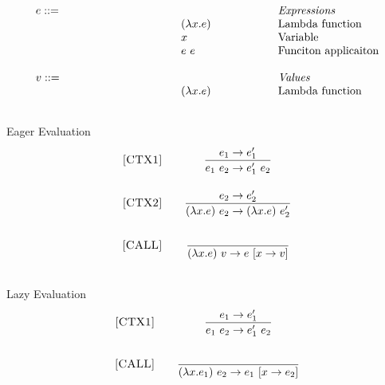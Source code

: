 \documentclass[addpoints]{exam}
\begin{document}
\newcommand{\mydefhead}[2]{\multicolumn{2}{l}{{#1}}&\mbox{\emph{#2}}\\}
\newcommand{\mydefcase}[2]{\qquad\qquad\qquad\qquad\qquad\qquad& #1 &\mbox{#2}\\}

\newcommand{\setexp}[2]{\mbox{\tt set}~#1~#2}
\newcommand{\readexp}[1]{\mbox{\tt read}~#1}
\newcommand{\loopexp}[2]{\mbox{\tt loop}~#1~#2}
\newcommand{\incexp}[1]{\mbox{\tt inc}~{#1}}
\newcommand{\testexp}[2]{\mbox{\tt test}~{#1}~{#2}}
\newcommand{\thenexp}[2]{#1~\mbox{\tt then}~{#2}}
\newcommand{\crashexp}{\mbox{\tt crash}}
\newcommand{\rel}[1]{ \mbox{\sc [#1]} }
\newcommand{\sstep}[2]{{#1} \rightarrow {#2}}
\newcommand{\bstep}[2]{{#1} \Downarrow {#2}}
\newcommand{\tstep}[2]{{#1} \colon {#2}}

\newcommand{\ssrule}[3]{
  \rel{#1} &
  \frac{\strut\begin{array}{@{}c@{}} #2 \end{array}}
       {\strut\begin{array}{@{}c@{}} #3 \end{array}}
   \\~\\
}

\newcommand{\Esucc}[1]{\mbox{\tt succ}~#1}
\newcommand{\Epred}[1]{\mbox{\tt pred}~#1}
\newcommand{\Eiszero}[1]{\mbox{\tt iszero}~#1}
\newcommand{\Econcat}[2]{\mbox{\tt concat}~{#1}~{#2}}
\newcommand{\Eisstring}[1]{\mbox{\tt isstring}~#1}
\newcommand{\Eisint}[1]{\mbox{\tt isint}~#1}
\newcommand{\Eisbool}[1]{\mbox{\tt isbool}~#1}
\newcommand{\ife}[3]{\mbox{\tt if}~{#1}~\mbox{\tt then}~{#2}~\mbox{\tt else}~{#3}}
\newcommand{\true}{\mbox{\tt true}}
\newcommand{\false}{\mbox{\tt false}}
\newcommand{\lamexp}[2]{(\lambda{#1}.{#2})}

\[
  \begin{array}{ll@{\qquad\qquad\qquad}l}
  \mydefhead{e ::=}{Expressions}
    \mydefcase{\lamexp{x}{e}}{Lambda function}
    \mydefcase{x}{Variable}
    \mydefcase{e~e}{Funciton applicaiton}
  \\
  \mydefhead{v ::=}{Values}
    \mydefcase{\lamexp{x}{e}}{Lambda function}
  \\
\end{array}
\]


Eager Evaluation
\[
  \begin{array}{r@{\qquad}c}
    \ssrule{CTX1}{
        \sstep{e_1}{e_1'}
    }{
        \sstep{e_1~e_2}{e_1'~e_2}
    }
    \ssrule{CTX2}{
        \sstep{e_2}{e_2'}
    }{
        \sstep{\lamexp{x}{e}~e_2}{\lamexp{x}{e}~e_2'}
    }
    \ssrule{CALL}{
    }{
        \sstep{\lamexp{x}{e}~v}{e~ [x \rightarrow v]}
    }
\end{array}
\]

Lazy Evaluation
\[
  \begin{array}{r@{\qquad}c}
    \ssrule{CTX1}{
        \sstep{e_1}{e_1'}
    }{
        \sstep{e_1~e_2}{e_1'~e_2}
    }
    \ssrule{CALL}{
    }{
        \sstep{\lamexp{x}{e_1}~e_2}{e_1~ [x \rightarrow e_2]}
    }
\end{array}
\]
\end{document}
